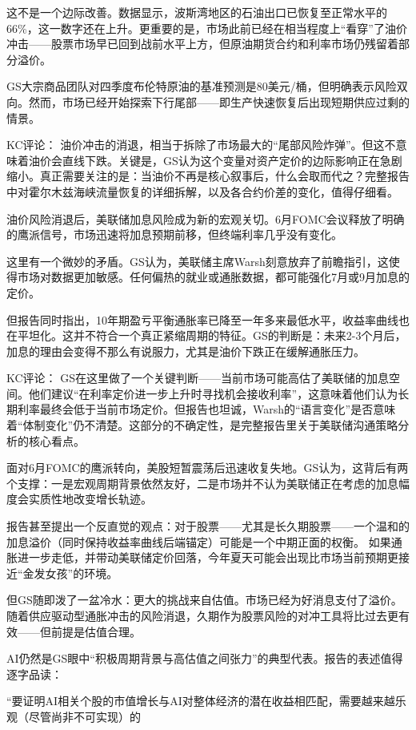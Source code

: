 \documentclass[11pt]{ctexart}
\begin{document}
这不是一个边际改善。数据显示，波斯湾地区的石油出口已恢复至正常水平的66\%，这一数字还在上升。更重要的是，市场此前已经在相当程度上“看穿”了油价冲击——股票市场早已回到战前水平上方，但原油期货合约和利率市场仍残留着部分溢价。

GS大宗商品团队对四季度布伦特原油的基准预测是80美元/桶，但明确表示风险双向。然而，市场已经开始探索下行尾部——即生产快速恢复后出现短期供应过剩的情景。

KC评论： 油价冲击的消退，相当于拆除了市场最大的“尾部风险炸弹”。但这不意味着油价会直线下跌。关键是，GS认为这个变量对资产定价的边际影响正在急剧缩小。真正需要关注的是：当油价不再是核心叙事后，什么会取而代之？完整报告中对霍尔木兹海峡流量恢复的详细拆解，以及各合约价差的变化，值得仔细看。

油价风险消退后，美联储加息风险成为新的宏观关切。6月FOMC会议释放了明确的鹰派信号，市场迅速将加息预期前移，但终端利率几乎没有变化。

这里有一个微妙的矛盾。GS认为，美联储主席Warsh刻意放弃了前瞻指引，这使得市场对数据更加敏感。任何偏热的就业或通胀数据，都可能强化7月或9月加息的定价。

但报告同时指出，10年期盈亏平衡通胀率已降至一年多来最低水平，收益率曲线也在平坦化。这并不符合一个真正紧缩周期的特征。GS的判断是：未来2-3个月后，加息的理由会变得不那么有说服力，尤其是油价下跌正在缓解通胀压力。

KC评论： GS在这里做了一个关键判断——当前市场可能高估了美联储的加息空间。他们建议“在利率定价进一步上升时寻找机会接收利率”，这意味着他们认为长期利率最终会低于当前市场定价。但报告也坦诚，Warsh的“语言变化”是否意味着“体制变化”仍不清楚。这部分的不确定性，是完整报告里关于美联储沟通策略分析的核心看点。

面对6月FOMC的鹰派转向，美股短暂震荡后迅速收复失地。GS认为，这背后有两个支撑：一是宏观周期背景依然友好，二是市场并不认为美联储正在考虑的加息幅度会实质性地改变增长轨迹。

报告甚至提出一个反直觉的观点：对于股票——尤其是长久期股票——一个温和的加息溢价（同时保持收益率曲线后端锚定）可能是一个中期正面的权衡。 如果通胀进一步走低，并带动美联储定价回落，今年夏天可能会出现比市场当前预期更接近“金发女孩”的环境。

但GS随即泼了一盆冷水：更大的挑战来自估值。市场已经为好消息支付了溢价。随着供应驱动型通胀冲击的风险消退，久期作为股票风险的对冲工具将比过去更有效——但前提是估值合理。

AI仍然是GS眼中“积极周期背景与高估值之间张力”的典型代表。报告的表述值得逐字品读：

“要证明AI相关个股的市值增长与AI对整体经济的潜在收益相匹配，需要越来越乐观（尽管尚非不可实现）的
\end{document}
